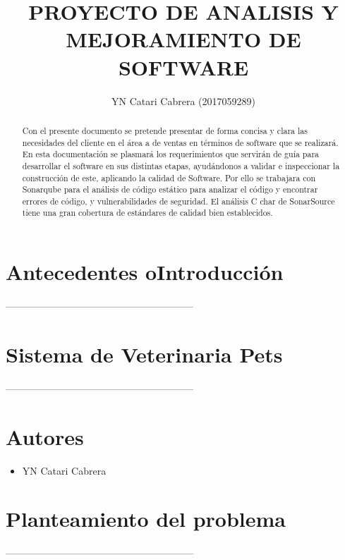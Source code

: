 \documentclass[preprint,12pt]{elsarticle}
\begin{document}
	
	\begin{frontmatter}

		\title{\huge  PROYECTO DE  ANALISIS Y  MEJORAMIENTO DE  SOFTWARE }
		\author{YN Catari Cabrera              (2017059289)}
		
		\address{Tacna, Perú}
		


\begin{abstract}
Con el presente documento se pretende presentar de forma concisa y clara las necesidades del cliente en el área a de ventas en términos de software que se realizará. 
En esta documentación se plasmará los requerimientos que servirán de guía para desarrollar el software en sus distintas etapas, ayudándonos a validar e inspeccionar la construcción de este, aplicando la calidad de Software.
Por ello se trabajara con  Sonarqube para el análisis de código estático
para analizar el código y encontrar errores de código, y vulnerabilidades de seguridad. 
El análisis C char de SonarSource tiene una gran cobertura de estándares de calidad bien establecidos.  
\end{abstract}


\end{frontmatter}
\section{Antecedentes oIntroducción}

---------------------------------------------------------

\section{Sistema de  Veterinaria Pets}
---------------------------------------------------------
\section{Autores}
\begin{itemize}
    \item YN Catari Cabrera
    
    
\end{itemize}
\section{Planteamiento del problema}
---------------------------------------------------------
\end{document}
